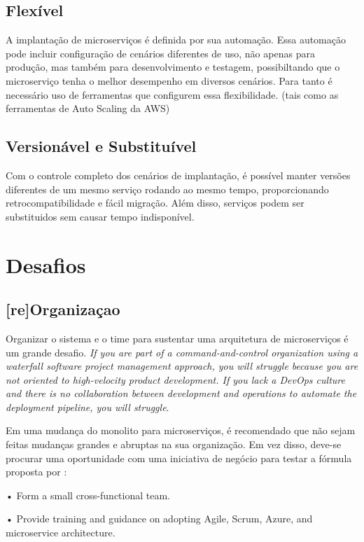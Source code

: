 \subsection{Flexível}

A implantação de microserviços é definida por sua automação. Essa automação pode incluir configuração de cenários diferentes de uso, não apenas para produção, mas também para desenvolvimento e testagem, possibiltando que o microserviço tenha o melhor desempenho em diversos cenários. Para tanto é necessário uso de ferramentas que configurem essa flexibilidade. (tais como as ferramentas de Auto Scaling da AWS)

\subsection{Versionável e Substituível}

Com o controle completo dos cenários de implantação, é possível manter versões diferentes de um mesmo serviço rodando ao mesmo tempo, proporcionando retrocompatibilidade e fácil migração. Além disso, serviços podem ser substituidos sem causar tempo indisponível.

\section{Desafios}

\subsection{[re]Organizaçao}

Organizar o sistema e o time para sustentar uma arquitetura de microserviços é um grande desafio. \emph{If you are part of a command-and-control organization using a waterfall software project management approach, you will struggle because you are not oriented to high-velocity product development. If you lack a DevOps culture and there is no collaboration between development and operations to automate the deployment pipeline, you will struggle}.

Em uma mudança do monolito para microserviços, é recomendado que não sejam feitas mudanças grandes e abruptas na sua organização. Em vez disso, deve-se procurar uma oportunidade com uma iniciativa de negócio para testar a fórmula proposta por  : 

•	 Form a small cross-functional team.

•	 Provide training and guidance on adopting Agile, Scrum, Azure, and microservice architecture.

